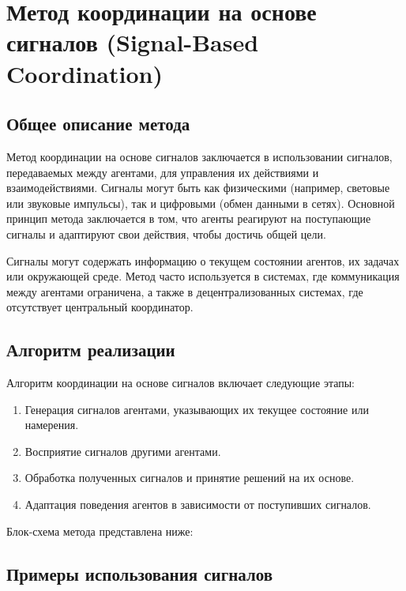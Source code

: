 \section{Метод координации на основе сигналов (Signal-Based Coordination)}

\subsection{Общее описание метода}

Метод координации на основе сигналов заключается в использовании сигналов, передаваемых между агентами, для управления их действиями и взаимодействиями.  
Сигналы могут быть как физическими (например, световые или звуковые импульсы), так и цифровыми (обмен данными в сетях).  
Основной принцип метода заключается в том, что агенты реагируют на поступающие сигналы и адаптируют свои действия, чтобы достичь общей цели.

Сигналы могут содержать информацию о текущем состоянии агентов, их задачах или окружающей среде.  
Метод часто используется в системах, где коммуникация между агентами ограничена, а также в децентрализованных системах, где отсутствует центральный координатор.

\subsection{Алгоритм реализации}

Алгоритм координации на основе сигналов включает следующие этапы:
\begin{enumerate}
	\item Генерация сигналов агентами, указывающих их текущее состояние или намерения.
	\item Восприятие сигналов другими агентами.
	\item Обработка полученных сигналов и принятие решений на их основе.
	\item Адаптация поведения агентов в зависимости от поступивших сигналов.
\end{enumerate}

Блок-схема метода представлена ниже:

\begin{center}
\end{center}

\subsection{Примеры использования сигналов}

